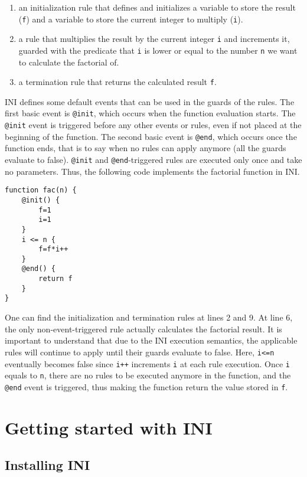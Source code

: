\documentclass[11pt]{report}
\begin{document}
\begin{enumerate}
\item an initialization rule that defines and initializes a variable to store the result (\texttt{f}) and a variable to store the current integer to multiply (\texttt{i}).
\item a rule that multiplies the result by the current integer \texttt{i} and increments it, guarded with the predicate that \texttt{i} is lower or equal to the number \texttt{n} we want to calculate the factorial of.
\item a termination rule that returns the calculated result \texttt{f}.
\end{enumerate}

INI defines some default events that can be used in the guards of the rules. The first basic event is \texttt{@init}, which occurs when the function evaluation starts. The \texttt{@init} event is triggered before any other events or rules, even if not placed at the beginning of the function. The second basic event is \texttt{@end}, which occurs once the function ends, that is to say when no rules can apply anymore (all the guards evaluate to false). \texttt{@init} and \texttt{@end}-triggered rules are executed only once and take no parameters. Thus, the following code implements the factorial function in INI.

\begin{lstlisting}
function fac(n) {
	@init() {
		f=1
		i=1
	}
	i <= n {
		f=f*i++
	}
	@end() {
		return f
	}
}
\end{lstlisting}

One can find the initialization and termination rules at lines 2 and 9. At line 6, the only non-event-triggered rule actually calculates the factorial result. It is important to understand that due to the INI execution semantics, the applicable rules will continue to apply until their guards evaluate to false. Here, \texttt{i<=n} eventually becomes false since \texttt{i++} increments \texttt{i} at each rule execution. Once \texttt{i} equals to \texttt{n}, there are no rules to be executed anymore in the function, and the \texttt{@end} event is triggered, thus making the function return the value stored in \texttt{f}.

\chapter{Getting started with INI}

\section{Installing INI}
\end{document}

